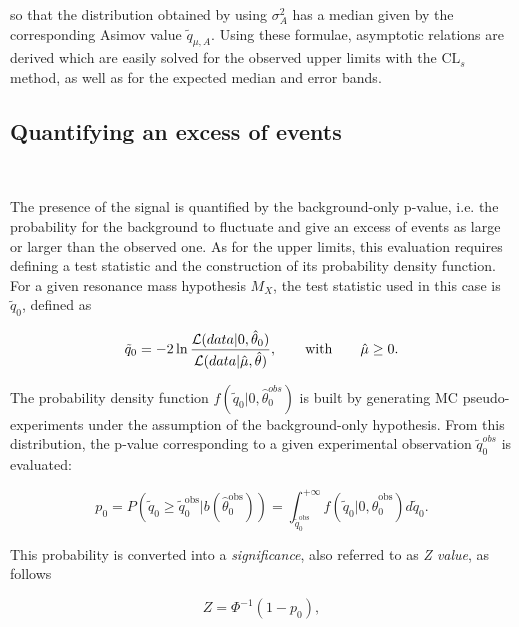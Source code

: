 so that the distribution obtained by using $\sigma_A^2$ has a median given by the corresponding Asimov value $\tilde{q}_{\mu,A}$. 
Using these formulae, asymptotic relations are derived which are easily solved for the observed upper limits with the $\mathrm{CL}_s$ method,
as well as for the expected median and error bands.

\subsection{Quantifying an excess of events}~\label{subsec:pvalue}

The presence of the signal is quantified by the background-only p-value, i.e. the probability for the background to fluctuate
and give an excess of events as large or larger than the observed one.
As for the upper limits, this evaluation requires defining a test statistic and the construction of its probability density function.
For a given resonance mass hypothesis $M_X$, the test statistic used in this case is $\tilde{q}_0$, defined as

\begin{equation}
\tilde{q}_0 = -2\ln\frac{{\cal L}(data | 0,\hat{\theta}_0)}{{\cal L}( data | \hat{\mu},\hat{\theta})},\qquad \mathrm{with} \qquad \hat{\mu} \geq 0.
\end{equation}

The probability density function $f(\tilde{q}_0|0,\hat{\theta}_0^{obs})$ is built by generating MC pseudo-experiments under the assumption of the background-only hypothesis.
From this distribution, the p-value corresponding to a given experimental observation $\tilde{q}_0^{obs}$ is evaluated:

\begin{equation}
p_0 = P(\tilde{q}_0 \geq \tilde{q}_0^\mathrm{obs}|b(\hat{\theta}_0^\mathrm{obs})) = \int_{\tilde{q}_0^\mathrm{obs}}^{+\infty} f(\tilde{q}_0|0,\hat{\theta}_0^\mathrm{obs})d\tilde{q}_0.
\end{equation}

This probability is converted into a \textit{significance}, also referred to as \textit{Z value}, as follows

\begin{equation}
Z = \Phi^{-1} (1-p_0),
\end{equation}

